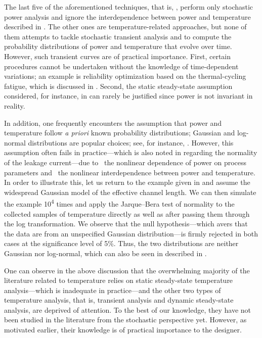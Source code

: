 The last five of the aforementioned techniques, that is, \cite{bhardwaj2006,
vrudhula2006, ghanta2006, bhardwaj2008, shen2009}, perform only stochastic power
analysis and ignore the interdependence between power and temperature described
in . The other ones are temperature-related approaches, but
none of them attempts to tackle stochastic transient analysis and to compute the
probability distributions of power and temperature that evolve over time.
However, such transient curves are of practical importance. First, certain
procedures cannot be undertaken without the knowledge of time-dependent
variations; an example is reliability optimization based on the thermal-cycling
fatigue, which is discussed in . Second, the
static steady-state assumption considered, for instance, in \cite{huang2009a,
juan2011, juan2012, lee2013} can rarely be justified since power is not
invariant in reality.

In addition, one frequently encounters the assumption that power and temperature
follow \emph{a priori} known probability distributions; Gaussian and log-normal
distributions are popular choices; see, for instance, \cite{bhardwaj2006,
srivastava2010, juan2012}. However, this assumption often fails in
practice---which is also noted in \cite{juan2012} regarding the normality of the
leakage current---due to \one~the nonlinear dependence of power on process
parameters and \two~the nonlinear interdependence between power and temperature.
In order to illustrate this, let us return to the example given in
 and assume the widespread Gaussian model of the
effective channel length. We can then simulate the example 10\textsuperscript{4}
times and apply the Jarque--Bera test of normality to the collected samples of
temperature directly as well as after passing them through the log
transformation. We observe that the null hypothesis---which avers that the data
are from an unspecified Gaussian distribution---is firmly rejected in both cases
at the significance level of 5\%. Thus, the two distributions are neither
Gaussian nor log-normal, which can also be seen in 
described in .

One can observe in the above discussion that the overwhelming majority of the
literature related to temperature relies on static steady-state temperature
analysis---which is inadequate in practice---and the other two types of
temperature analysis, that is, transient analysis and dynamic steady-state
analysis, are deprived of attention. To the best of our knowledge, they have not
been studied in the literature from the stochastic perspective yet. However, as
motivated earlier, their knowledge is of practical importance to the designer.

